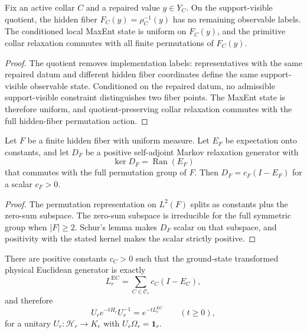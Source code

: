 \begin{lemma}
\label{lem:ym-fiber-symmetry}
Fix an active collar \(C\) and a repaired value \(y\in Y_C\). On the support-visible quotient,
the hidden fiber \(F_C(y)=\rho_C^{-1}(y)\) has no remaining observable labels. The conditioned
local MaxEnt state is uniform on \(F_C(y)\), and the primitive collar relaxation commutes with all
finite permutations of \(F_C(y)\).
\end{lemma}

\begin{proof}
The quotient removes implementation labels: representatives with the same repaired datum and
different hidden fiber coordinates define the same support-visible observable state. Conditioned
on the repaired datum, no admissible support-visible constraint distinguishes two fiber points.
The MaxEnt state is therefore uniform, and quotient-preserving collar relaxation commutes with the
full hidden-fiber permutation action.
\end{proof}

\begin{lemma}
\label{lem:ym-scalar-relaxation}
Let \(F\) be a finite hidden fiber with uniform measure. Let \(E_F\) be expectation onto constants,
and let \(D_F\) be a positive self-adjoint Markov relaxation generator with
\[
\ker D_F=\operatorname{Ran}(E_F)
\]
that commutes with the full permutation group of \(F\). Then \(D_F=c_F(I-E_F)\) for a scalar
\(c_F>0\).
\end{lemma}

\begin{proof}
The permutation representation on \(L^2(F)\) splits as constants plus the zero-sum subspace. The
zero-sum subspace is irreducible for the full symmetric group when \(|F|\ge2\). Schur's lemma
makes \(D_F\) scalar on that subspace, and positivity with the stated kernel makes the scalar
strictly positive.
\end{proof}

\begin{theorem}
\label{thm:euclidean-consensus-law}
There are positive constants \(c_C>0\) such that the ground-state transformed physical Euclidean
generator is exactly
\[
L_r^{\mathrm{EC}}=\sum_{C\in\mathcal C_r} c_C(I-E_C),
\]
and therefore
\[
U_r e^{-tH_r}U_r^{-1}=e^{-tL_r^{\mathrm{EC}}}\qquad(t\ge 0),
\]
for a unitary \(U_r:\mathcal H_r\to K_r\) with \(U_r\Omega_r=\mathbf 1_r\).
\end{theorem}

